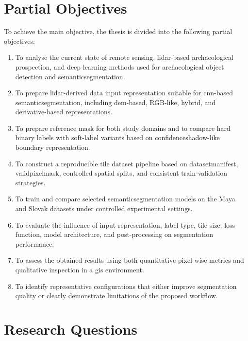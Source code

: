 \section{Partial Objectives}

To achieve the main objective, the thesis is divided into the following partial objectives:
\begin{enumerate}
    \item To analyse the current state of remote sensing, \gls{lidar}-based archaeological prospection, and deep learning methods used for archaeological object detection and \gls{semanticsegmentation}.

    \item To prepare \gls{lidar}-derived data input representation suitable for \gls{cnn}-based \gls{semanticsegmentation}, including \gls{dem}-based, RGB-like, hybrid, and derivative-based representations.

    \item To prepare reference mask for both study domains and to compare hard binary labels with soft-label variants based on \gls{confidenceshadow}-like boundary representation.

    \item To construct a reproducible tile dataset pipeline based on \gls{datasetmanifest}, \gls{validpixelmask}, controlled spatial splits, and consistent train-validation strategies.

    \item To train and compare selected \gls{semanticsegmentation} models on the Maya and Slovak datasets under controlled experimental settings.

    \item To evaluate the influence of input representation, label type, tile size, loss function, model architecture, and post-processing on segmentation performance.

    \item To assess the obtained results using both quantitative pixel-wise metrics and qualitative inspection in a \gls{gis} environment.

    \item To identify representative configurations that either improve segmentation quality or clearly demonstrate limitations of the proposed workflow.
\end{enumerate}

\section{Research Questions}

